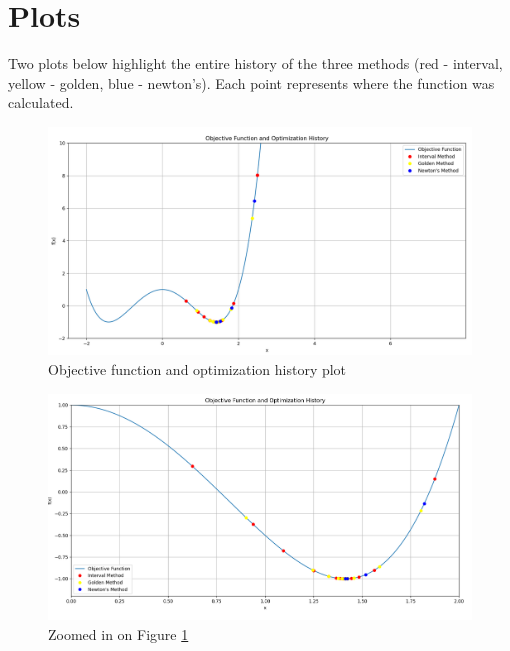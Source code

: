 \documentclass{article}
\begin{document}
    \section{Plots}
        Two plots below highlight the entire history of the three methods (red - interval, yellow - golden, blue - newton's). Each point represents where the function was calculated.
        \begin{figure}[H]
            \centering
            \includegraphics[width=1\textwidth]{plot-1.png}
            \caption{Objective function and optimization history plot}
            \label{fig:zoomed-out}
        \end{figure}
        \begin{figure}[H]
            \centering
            \includegraphics[width=1\textwidth]{plot-2.png}
            \caption{Zoomed in on Figure \ref{fig:zoomed-out}}
            \label{fig:zommed-in}
        \end{figure}
\end{document}
